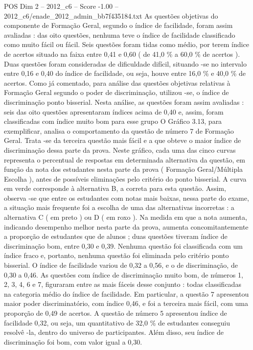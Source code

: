 \begin{textsample}{POS Dim 2 – 2012\_c6 – Score -1.00 – 2012\_c6/enade\_2012\_admin\_bb7f435184.txt}
As questões objetivas do componente de Formação Geral, segundo o índice de facilidade, foram assim avaliadas : das oito questões, nenhuma teve o índice de facilidade classificado como muito fácil ou fácil.
Seis questões foram tidas como médio, por terem índice de acertos situado na faixa entre 0,41 e 0,60 ( de 41,0 \% a 60,0 \% de acertos ).
Duas questões foram consideradas de dificuldade difícil, situando -se no intervalo entre 0,16 e 0,40 do índice de facilidade, ou seja, houve entre 16,0 \% e 40,0 \% de acertos.
Como já comentado, para análise das questões objetivas relativas à Formação Geral segundo o poder de discriminação, utilizou -se, o índice de discriminação ponto bisserial.
Nesta análise, as questões foram assim avaliadas : seis das oito questões apresentaram índices acima de 0,40 e, assim, foram classificadas com índice muito bom para esse grupo O Gráfico 3.13, para exemplificar, analisa o comportamento da questão de número 7 de Formação Geral.
Trata -se da terceira questão mais fácil e a que obteve o maior índice de discriminação dessa parte da prova.
Neste gráfico, cada uma das cinco curvas representa o percentual de respostas em determinada alternativa da questão, em função da nota dos estudantes nesta parte da prova ( Formação Geral/Múltipla Escolha ), antes de possíveis eliminações pelo critério do ponto bisserial.
A curva em verde corresponde à alternativa B, a correta para esta questão.
Assim, observa -se que entre os estudantes com notas mais baixas, nessa parte do exame, a situação mais frequente foi a escolha de uma das alternativas incorretas : a alternativa C ( em preto ) ou D ( em roxo ).
Na medida em que a nota aumenta, indicando desempenho melhor nesta parte da prova, aumenta concomitantemente a proporção de estudantes que de alunos ; duas questões tiveram índice de discriminação bom, entre 0,30 e 0,39.
Nenhuma questão foi classificada com um índice fraco e, portanto, nenhuma questão foi eliminada pelo critério ponto bisserial.
O índice de facilidade variou de 0,32 a 0,56, e o de discriminação, de 0,30 a 0,46.
As questões com índice de discriminação muito bom, de números 1, 2, 3, 4, 6 e 7, figuraram entre as mais fáceis desse conjunto : todas classificadas na categoria médio do índice de facilidade.
Em particular, a questão 7 apresentou maior poder discriminatório, com índice 0,46, e foi a terceira mais fácil, com uma proporção de 0,49 de acertos.
A questão de número 5 apresentou índice de facilidade 0,32, ou seja, um quantitativo de 32,0 \% de estudantes conseguiu resolvê -la, dentro do universo de participantes.
Além disso, seu índice de discriminação foi bom, com valor igual a 0,30.

\end{textsample}
